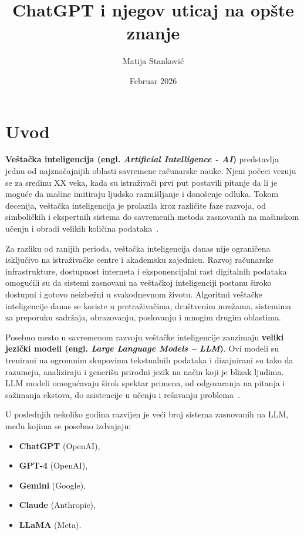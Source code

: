 \documentclass[a4paper, 12pt]{article}
\title{ChatGPT i njegov uticaj na opšte znanje}
\author{Matija Stanković}
\date{Februar 2026}
\begin{document}
\maketitle
\newpage
\tableofcontents
\newpage

\section{Uvod}

\textbf{Veštačka inteligencija (engl. \textit{Artificial Intelligence - AI})} predstavlja jednu od najznačajnijih oblasti savremene računarske nauke. Njeni počeci vezuju se za sredinu XX veka, kada su istraživači prvi put postavili pitanje da li je moguće da mašine imitiraju ljudsko razmišljanje i donošenje odluka. Tokom decenija, veštačka inteligencija je prolazila kroz različite faze razvoja, od simboličkih i ekspertnih sistema do savremenih metoda zasnovanih na mašinskom učenju i obradi velikih količina podataka~\cite{russell2020}.

Za razliku od ranijih perioda, veštačka inteligencija danas nije ograničena isključivo na istraživačke centre i akademsku zajednicu. Razvoj računarske infrastrukture, dostupnost interneta i eksponencijalni rast digitalnih podataka omogućili su da sistemi zasnovani na veštačkoj inteligenciji postanu široko dostupni i gotovo neizbežni u svakodnevnom životu. Algoritmi veštačke inteligencije danas se koriste u pretraživačima, društvenim mrežama, sistemima za preporuku sadržaja, obrazovanju, poslovanju i mnogim drugim oblastima.

Posebno mesto u savremenom razvoju veštačke inteligencije zauzimaju \textbf{veliki jezički modeli (engl. \textit{Large Language Models – LLM})}. Ovi modeli su trenirani na ogromnim skupovima tekstualnih podataka i dizajnirani su tako da razumeju, analiziraju i generišu prirodni jezik na način koji je blizak ljudima. LLM modeli omogućavaju širok spektar primena, od odgovaranja na pitanja i sažimanja  ekstova, do asistencije u učenju i rešavanju problema~\cite{bommasani2021}.

U poslednjih nekoliko godina razvijen je veći broj sistema zasnovanih na LLM, među kojima se posebno izdvajaju:
\begin{itemize}
    \item \textbf{ChatGPT} (OpenAI),
    \item \textbf{GPT-4} (OpenAI),
    \item \textbf{Gemini} (Google),
    \item \textbf{Claude} (Anthropic),
    \item \textbf{LLaMA} (Meta).
\end{itemize}
\end{document}
